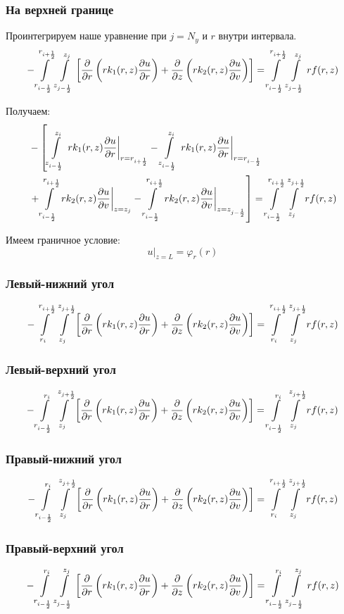 \subsubsection{На верхней границе}
Проинтегрируем наше уравнение при $ j = N_y $ и $ r $ внутри интервала.
\[
  - \int\limits^{r_{i +\frac{1}{2}}}_{r_{i -\frac{1}{2}}} \int\limits^{z_{j }}_{z_{j -\frac{1}{2}}} \left [ \pdv{}{r} \left ( r k_1(r, z) \pdv{u}{r} \right ) 
  + \pdv{}{z} \left ( rk_2(r, z)\pdv{u}{v} \right ) \right ] = \int\limits^{r_{i +\frac{1}{2}}}_{r_{i -\frac{1}{2}}} \int\limits^{z_{j }}_{z_{j -\frac{1}{2}}} rf(r, z)
\]

Получаем:
\begin{align*}
  &- \left [
   \int\limits^{z_{i}}_{z_{i-\frac{1}{2}}}  \left . r k_1(r, z) \pdv{u}{r} \right \vert_{r = r_{i + \frac{1}{2}}}
  - \int\limits^{z_{i}}_{z_{i-\frac{1}{2}}} \left . r k_1(r, z) \pdv{u}{r} \right \vert_{r = r_{i - \frac{1}{2}}}
  \right . \\
  &\left . + \int\limits^{r_{i+\frac{1}{2}}}_{r_{i-\frac{1}{2}}} \left . rk_2(r, z)\pdv{u}{v} \right \vert_{z = z_{j}}
  - \int\limits^{r_{i+\frac{1}{2}}}_{r_{i-\frac{1}{2}}} \left . rk_2(r, z)\pdv{u}{v} \right \vert_{z = z_{j - \frac{1}{2}}}
  \right ] = \int\limits^{r_{i +\frac{1}{2}}}_{r_{i -\frac{1}{2}}} \int\limits^{z_{j +\frac{1}{2}}}_{z_{j }} rf(r, z)
\end{align*}

Имеем граничное условие:
\[
  \left . u \right \vert_{z=L} = \varphi_r(r) 
\]

\subsubsection{Левый-нижний угол}
\[
  - \int\limits^{r_{i +\frac{1}{2}}}_{r_{i }} \int\limits^{z_{j +\frac{1}{2}}}_{z_{j }} \left [ \pdv{}{r} \left ( r k_1(r, z) \pdv{u}{r} \right ) 
  + \pdv{}{z} \left ( rk_2(r, z)\pdv{u}{v} \right ) \right ] = \int\limits^{r_{i +\frac{1}{2}}}_{r_{i }} \int\limits^{z_{j +\frac{1}{2}}}_{z_{j }} rf(r, z)
\]
\subsubsection{Левый-верхний угол}
\[
  - \int\limits^{r_{i }}_{r_{i -\frac{1}{2}}} \int\limits^{z_{j +\frac{1}{2}}}_{z_{j }} \left [ \pdv{}{r} \left ( r k_1(r, z) \pdv{u}{r} \right ) 
  + \pdv{}{z} \left ( rk_2(r, z)\pdv{u}{v} \right ) \right ] = \int\limits^{r_{i }}_{r_{i -\frac{1}{2}}} \int\limits^{z_{j +\frac{1}{2}}}_{z_{j }} rf(r, z)
\]
\subsubsection{Правый-нижний угол}
\[
  - \int\limits^{r_{i }}_{r_{i -\frac{1}{2}}} \int\limits^{z_{j +\frac{1}{2}}}_{z_{j }} \left [ \pdv{}{r} \left ( r k_1(r, z) \pdv{u}{r} \right ) 
  + \pdv{}{z} \left ( rk_2(r, z)\pdv{u}{v} \right ) \right ] = \int\limits^{r_{i +\frac{1}{2}}}_{r_{i }} \int\limits^{z_{j +\frac{1}{2}}}_{z_{j }} rf(r, z)
\]
\subsubsection{Правый-верхний угол}
\[
  - \int\limits^{r_{i }}_{r_{i -\frac{1}{2}}} \int\limits^{z_{j }}_{z_{j -\frac{1}{2}}} \left [ \pdv{}{r} \left ( r k_1(r, z) \pdv{u}{r} \right ) 
  + \pdv{}{z} \left ( rk_2(r, z)\pdv{u}{v} \right ) \right ] = \int\limits^{r_{i }}_{r_{i -\frac{1}{2}}} \int\limits^{z_{j }}_{z_{j -\frac{1}{2}}} rf(r, z)
\]
